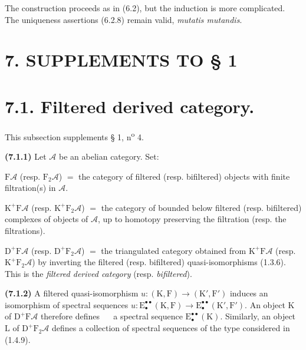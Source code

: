 \documentclass[11pt,leqno]{article}
\newcommand{\Page}[1]{\ifvmode\noindent\else\unskip\ \fi{\footnotesize\textcolor{gray}{[p.\,#1]}}\ \ignorespaces}
\begin{document}
The construction proceeds as in (6.2), but the induction is more complicated. The uniqueness assertions (6.2.8) remain valid, \textit{mutatis mutandis}.

\section*{7. SUPPLEMENTS TO § 1}

\section*{7.1. Filtered derived category.}

This subsection supplements § 1, n\textsuperscript{o} 4.

\textbf{(7.1.1)} Let \(\mathscr{A}\) be an abelian category. Set:

\noindent
\(\mathrm{F}\mathscr{A}\) (resp. \(\mathrm{F}_2\mathscr{A}\)) \(=\) the category of filtered (resp. bifiltered) objects with finite filtration(s) in \(\mathscr{A}\).

\noindent
\(\mathrm{K}^{+}\mathrm{F}\mathscr{A}\) (resp. \(\mathrm{K}^{+}\mathrm{F}_2\mathscr{A}\)) \(=\) the category of bounded below filtered (resp. bifiltered) complexes of objects of \(\mathscr{A}\), up to homotopy preserving the filtration (resp. the filtrations).

\noindent
\(\mathrm{D}^{+}\mathrm{F}\mathscr{A}\) (resp. \(\mathrm{D}^{+}\mathrm{F}_2\mathscr{A}\)) \(=\) the triangulated category obtained from \(\mathrm{K}^{+}\mathrm{F}\mathscr{A}\) (resp. \(\mathrm{K}^{+}\mathrm{F}_2\mathscr{A}\)) by inverting the filtered (resp. bifiltered) quasi-isomorphisms (1.3.6). This is the \textit{filtered derived category} (resp. \textit{bifiltered}).

\textbf{(7.1.2)} A filtered quasi-isomorphism \(u:(\mathrm{K},\mathrm{F})\to(\mathrm{K}',\mathrm{F}')\) induces an isomorphism of spectral sequences \(u:\mathrm{E}_{\bullet}^{\bullet\bullet}(\mathrm{K},\mathrm{F})\to\mathrm{E}_{\bullet}^{\bullet\bullet}(\mathrm{K}',\mathrm{F}')\). An object \(\mathrm{K}\) of \(\mathrm{D}^{+}\mathrm{F}\mathscr{A}\) therefore defines
\Page{24}
a spectral sequence \(\mathrm{E}_{\bullet}^{\bullet\bullet}(\mathrm{K})\). Similarly, an object \(\mathrm{L}\) of \(\mathrm{D}^{+}\mathrm{F}_2\mathscr{A}\) defines a collection of spectral sequences of the type considered in (1.4.9).
\end{document}
